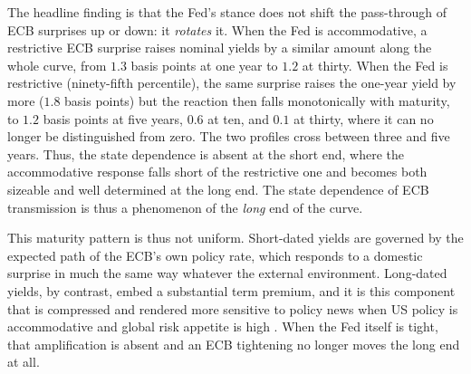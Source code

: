 
The headline finding is that the Fed's stance does not shift the pass-through of ECB surprises up or down: it \textit{rotates} it. When the Fed is accommodative, a restrictive ECB surprise raises nominal yields by a similar amount along the whole curve, from $1.3$ basis points at one year to $1.2$ at thirty. When the Fed is restrictive (ninety-fifth percentile), the same surprise raises the one-year yield by more ($1.8$ basis points) but the reaction then falls monotonically with maturity, to $1.2$ basis points at five years, $0.6$ at ten, and $0.1$ at thirty, where it can no longer be distinguished from zero. The two profiles cross between three and five years. Thus, the state dependence is absent at the short end, where the accommodative response falls short of the restrictive one and becomes both sizeable and well determined at the long end. The state dependence of ECB transmission is thus a phenomenon of the \textit{long} end of the curve.

This maturity pattern is thus not uniform. Short-dated yields are governed by the expected path of the ECB's own policy rate, which responds to a domestic surprise in much the same way whatever the external environment. Long-dated yields, by contrast, embed a substantial term premium, and it is this component that is compressed and rendered more sensitive to policy news when US policy is accommodative and global risk appetite is high \citep{miranda2020us}. When the Fed itself is tight, that amplification is absent and an ECB tightening no longer moves the long end at all.

